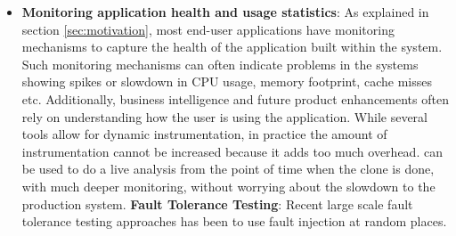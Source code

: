 \begin{itemize}[leftmargin=*,topsep=0pt,itemsep=-1ex,partopsep=1ex,parsep=1ex]
\item \textbf{Monitoring application health and usage statistics}: 
As explained in section \ref{sec:motivation}, most end-user applications have monitoring mechanisms to capture the health of the application built within the system.
Such monitoring mechanisms can often indicate problems in the systems showing spikes or slowdown in CPU usage, memory footprint, cache misses etc.
Additionally, business intelligence and future product enhancements often rely on understanding how the user is using the application.
While several tools allow for dynamic instrumentation, in practice the amount of instrumentation cannot be increased because it adds too much overhead.
\parikshan can be used to do a live analysis from the point of time when the clone is done, with much deeper monitoring, without worrying about the slowdown to the production system.
\iffalse
\textbf{Fault Tolerance Testing}: 
Recent large scale fault tolerance testing approaches has been to use fault injection at random places.

\end{itemize}
